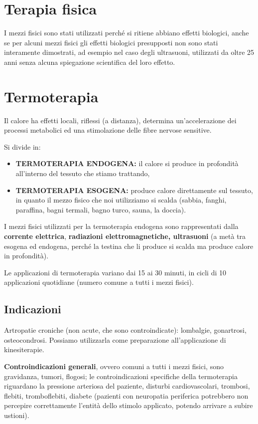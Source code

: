 \section{Terapia fisica}

I mezzi fisici sono stati utilizzati perché si ritiene abbiano effetti biologici, anche se per alcuni mezzi fisici gli effetti biologici presupposti non sono stati interamente dimostrati, ad esempio nel caso degli ultrasuoni, utilizzati da oltre 25 anni senza alcuna spiegazione scientifica del loro effetto.

\section{Termoterapia}

Il calore ha effetti locali, riflessi (a distanza), determina un'accelerazione dei processi metabolici ed una stimolazione delle fibre nervose sensitive.

Si divide in:
\begin{itemize}
\item \textbf{TERMOTERAPIA ENDOGENA:} il calore si produce in profondità all'interno del tessuto che stiamo trattando,
\item \textbf{TERMOTERAPIA ESOGENA:} produce calore direttamente sul tessuto, in quanto il mezzo fisico che noi utilizziamo si scalda (sabbia, fanghi, paraffina, bagni termali, bagno turco, sauna, la doccia).
\end{itemize}
I mezzi fisici utilizzati per la termoterapia endogena sono rappresentati dalla \textbf{corrente elettrica}, \textbf{radiazioni elettromagnetiche, ultrasuoni} (a metà tra esogena ed endogena, perché la testina che li produce si scalda ma produce calore in profondità).

Le applicazioni di termoterapia variano dai 15 ai 30 minuti, in cicli di 10 applicazioni quotidiane (numero comune a tutti i mezzi fisici).

\subsection{Indicazioni}

Artropatie croniche (non acute, che sono controindicate): lombalgie, gonartrosi, osteocondrosi. Possiamo utilizzarla come preparazione all'applicazione di kinesiterapie.

\textbf{Controindicazioni generali}, ovvero comuni a tutti i mezzi fisici, sono gravidanza, tumori, flogosi; le controindicazioni specifiche della termoterapia riguardano la pressione arteriosa del paziente, disturbi cardiovascolari, trombosi, flebiti, tromboflebiti,
diabete (pazienti con neuropatia periferica potrebbero non percepire correttamente l'entità dello stimolo applicato, potendo arrivare a subire ustioni).

